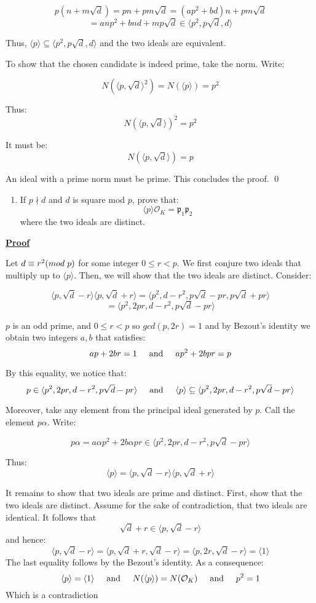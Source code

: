 \documentclass{article}
\def\_{{\hspace{1mm}}}
\def\contradiction{{\lightning}}
\newcommand{\Proof}{{
    \vspace{2mm}
    \noindent
    \textbf{
    \underline{Proof}}
}
}
\newcommand{\textAnd}{
    \hspace{5mm}
    \textrm{and}
    \hspace{5mm}
}
\newcommand{\<}{{{
    \langle
}}}
\def\>{{{
    \rangle
}}}
\newcommand{\ringInt}{
    {\mathcal{O}}
}
\newcommand{\pideal}{
    {{\mathfrak{p}}}
}
\begin{document}
\[
    p(n+m\sqrt{d}) = pn + pm\sqrt{d} 
    = (ap^2+bd)n+pm\sqrt{d}
\]
\[
    = anp^2+bnd+mp\sqrt{d} \in \<p^2, p\sqrt{d}, d\>
\]

Thus, $\<p\> \subseteq \<p^2, p\sqrt{d}, d\>$ and the two ideals are equivalent. 

To show that the chosen candidate is indeed prime, take the norm. 
Write:

\[
    N(\<p, \sqrt{d}\>^2) = N(\<p\>) = p^2
\]

Thus:
\[
    N(\<p, \sqrt{d}\>)^2 = p^2
\]

It must be:
\[
    N(\<p, \sqrt{d}\>) = p
\]

An ideal with a prime norm must be prime. This concludes the proof. 
\qed

\newpage
\begin{enumerate}[ii]
    \item If $p \nmid d$ and $d$ is square mod $p$, prove that:
        \[
            \<p\>\ringInt_K = \pideal_1\pideal_2
        \]
    where the two ideals are distinct. 
\end{enumerate}

\Proof
Let $d \equiv r^2 (mod\_p)$ for some integer $0\leq r< p$. 
We first conjure two ideals that multiply up to $\<p\>$. Then, 
we will show that the two ideals are distinct. Consider:

\[
    \<p, \sqrt{d}-r\>\<p, \sqrt{d}+r\>
    =\<p^2, d-r^2, p\sqrt{d}-pr, p\sqrt{d}+pr\>
\]
\[
    =\<p^2, 2pr, d-r^2, p\sqrt{d}-pr\>
\]

$p$ is an odd prime, and $0\leq r< p$ so $gcd(p, 2r)= 1$ 
and by Bezout's identity we obtain two integers $a, b$ that 
satisfies:
\[
    ap+2br = 1 \textAnd ap^2+2bpr = p
\]

By this equality, we notice that:
\[
    p \in \<p^2, 2pr, d-r^2, p\sqrt{d}-pr\>
    \textAnd
    \<p\> \subseteq \<p^2, 2pr, d-r^2, p\sqrt{d}-pr\>
\]

Moreover, take any element from the principal ideal generated by $p$.
Call the element $p\alpha$.  
Write:

\[
    p\alpha  = a\alpha p^2 + 2b\alpha pr  \in \<p^2, 2pr, d-r^2, p\sqrt{d}-pr\>
\]

Thus:
\[
    \<p\> = \<p, \sqrt{d}-r\>\<p, \sqrt{d}+r\>
\]

It remains to show that two ideals are prime and distinct. First, 
show that the two ideals are distinct. Assume for the sake of contradiction, 
that two ideals are identical. It follows that 
\[
    \sqrt{d}+r \in \<p, \sqrt{d}-r\>
\]
and hence:
\[
    \<p, \sqrt{d}-r\> = \<p, \sqrt{d}+r, \sqrt{d}-r\>
    =\<p, 2r, \sqrt{d}-r\> = \<1\>
\]
The last equality follows by the Bezout's identity. As a consequence:
\[
    \<p\> = \<1\> \textAnd N(\<p\>) = N(\ringInt_K) \textAnd p^2 = 1
\]
Which is a contradiction \contradiction 
\end{document}
